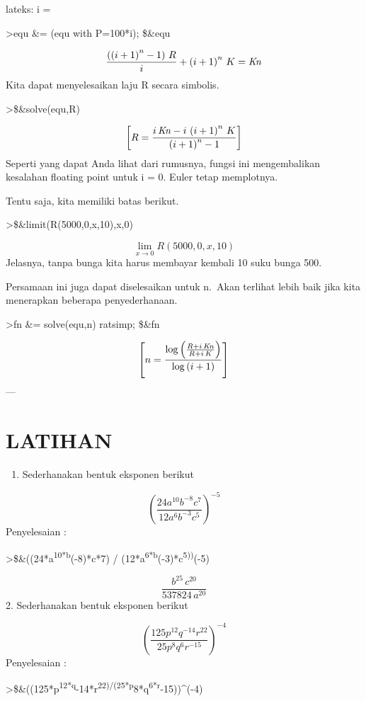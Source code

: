 \documentclass[
]{book}
\providecommand{\tightlist}{%
  \setlength{\itemsep}{0pt}\setlength{\parskip}{0pt}}
\begin{document}
lateks: i = 

\textgreater equ \&= (equ with P=100*i); \$\&equ

\[\frac{\left(\left(i+1\right)^{n}-1\right)\,R}{i}+\left(i+1\right)^{
 n}\,K={\it Kn}\]Kita dapat menyelesaikan laju R secara simbolis.

\textgreater\$\&solve(equ,R)

\[\left[ R=\frac{i\,{\it Kn}-i\,\left(i+1\right)^{n}\,K}{\left(i+1
 \right)^{n}-1} \right] \]Seperti yang dapat Anda lihat dari rumusnya, fungsi ini mengembalikan kesalahan floating point untuk i = 0. Euler tetap memplotnya.

Tentu saja, kita memiliki batas berikut.

\textgreater\$\&limit(R(5000,0,x,10),x,0)

\[\lim_{x\rightarrow 0}{R\left(5000 , 0 , x , 10\right)}\]Jelasnya, tanpa bunga kita harus membayar kembali 10 suku bunga 500.

Persamaan ini juga dapat diselesaikan untuk n.~Akan terlihat lebih baik jika kita menerapkan beberapa penyederhanaan.

\textgreater fn \&= solve(equ,n) \textbar{} ratsimp; \$\&fn

\[\left[ n=\frac{\log \left(\frac{R+i\,{\it Kn}}{R+i\,K}\right)}{
 \log \left(i+1\right)} \right] \]---

\chapter{LATIHAN}\label{latihan}

\begin{enumerate}
\def\labelenumi{\arabic{enumi}.}
\tightlist
\item
  Sederhanakan bentuk eksponen berikut
\end{enumerate}

\[\left( \frac {24a^{10}b^{-8}c^7}{12a^6b^{-3}c^5} \right)^{-5}\]Penyelesaian :

\textgreater\$\&((24*a\textsuperscript{10*b}(-8)*c*7) / (12*a\textsuperscript{6*b}(-3)*c\textsuperscript{5))}(-5)

\[\frac{b^{25}\,c^{20}}{537824\,a^{20}}\]2. Sederhanakan bentuk eksponen berikut

\[\left( \frac {125p^{12}q^{-14}r^{22}}{25p^8q^6r^{-15}} \right)^{-4}\]Penyelesaian :

\textgreater\$\&((125*p\textsuperscript{12*q}-14*r\textsuperscript{22)/(25*p}8*q\textsuperscript{6*r}-15))\^{}(-4)
\end{document}
